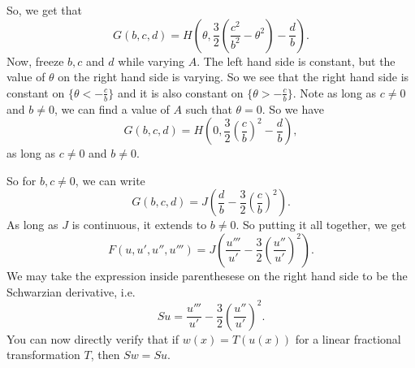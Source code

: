 So, we get that
\begin{equation}
G(b,c, d) = H\left(\theta, \frac{3}{2}\left(\frac{c^2}{b^2} - \theta^2\right) - \frac{d}{b} \right).
\end{equation}
Now, freeze \(b, c\) and \(d\) while varying \(A\). The left hand side is constant, but the value of \(\theta\)
on the right hand side is varying. So we see that the right hand side is constant on \(\{\theta < -\frac{c}{b}\}\) 
and it is also constant on \(\{\theta > -\frac{c}{b}\}\). Note as long as \(c \neq 0\) and \(b \neq 0\), we can
find a value of \(A\) such that \(\theta = 0\). So we have
\begin{equation}
G(b, c, d) = H\left(0, \frac{3}{2}\left(\frac{c}{b}\right)^2 - \frac{d}{b}\right),
\end{equation}
as long as \(c \neq 0\) and \(b \neq 0\).

So for \(b, c\neq 0\), we can write
\begin{equation}
G(b,c, d) = J\left(\frac{d}{b} - \frac{3}{2}\left(\frac{c}{b}\right)^2 \right).
\end{equation} 
As long as \(J\) is continuous, it extends to \(b \neq0\). So putting it all together, we get
\begin{equation}
F(u, u', u'', u''') = J\left( \frac{u'''}{u'} - \frac{3}{2}\left(\frac{u''}{u'}\right)^2 \right).
\end{equation}
We may take the expression inside parenthesese on the right hand side to be the Schwarzian derivative, i.e.
\begin{equation}
Su = \frac{u'''}{u'} - \frac{3}{2} \left(\frac{u''}{u'}\right)^2.
\end{equation}
You can now directly verify that if \(w(x) = T(u(x))\) for a linear fractional transformation \(T\), then
\(Sw = Su\).
